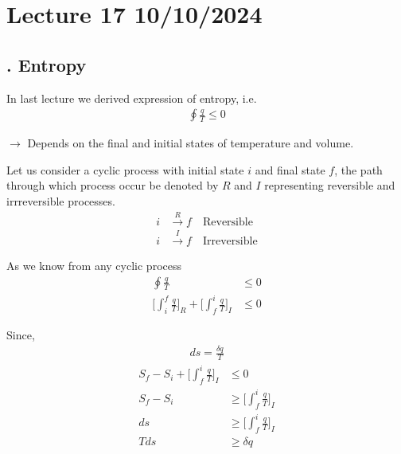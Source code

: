\documentclass[fleqn,10pt]{SelfArx} %
\begin{document}
\clearpage

\section{Lecture 17 10/10/2024}

\subsection{. Entropy}
In last lecture we derived expression of entropy, i.e.
\begin{align*}
\oint \frac{q}{T} \leq 0 
\end{align*}

$\rightarrow$ Depends on the final and initial states of temperature and volume.

Let us consider a cyclic process with initial state $i$ and final state $f$, the path through which process occur be denoted by $R$ and $I$ representing reversible and irrreversible processes.
\begin{align*}
    i &\overset{R}{\longrightarrow} f \quad \text{Reversible} \\
    i &\overset{I}{\longrightarrow} f \quad \text{Irreversible}
\end{align*}

\begin{center}
\end{center}

As we know from any cyclic process
\begin{align}
    \oint \frac{q}{T} &\leq 0 \\
    \Big[\int^f_i \frac{q}{T}\Big]_R + \Big[\int^i_f \frac{q}{T}\Big]_I &\leq 0
\end{align}

Since, 
\begin{align}
    ds = \frac{\delta q}{T}
\end{align}
\begin{align}
    S_f - S_i + \Big[\int^i_f \frac{q}{T}\Big]_I &\leq 0 \\
    S_f - S_i &\geq \Big[\int^i_f \frac{q}{T}\Big]_I \\
    ds &\geq \Big[\int^i_f \frac{q}{T}\Big]_I \\
    Tds &\geq \delta q
\end{align}
\end{document}
